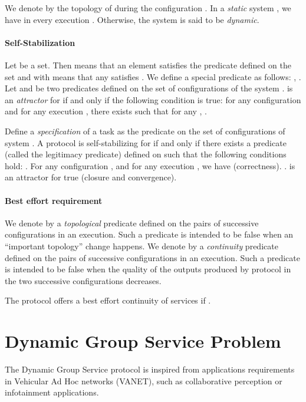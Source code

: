\documentclass[11pt,english]{article}
\begin{document}
We denote by  the topology of  during the configuration
.
In a \emph{static} system , we have  in every
execution .  Otherwise, the system  is said to
be \emph{dynamic}.

\paragraph{Self-Stabilization}
Let  be a set. Then  means that an element  satisfies the predicate  defined on the set  and
 with  means that any  satisfies
.
We define a special predicate  as follows:
, .
Let  and  be two predicates defined on the set of configurations
 of the system .   is an {\em attractor} for
 if and only if the following condition is true: for any configuration
 and for any execution , there exists  such that for any , .

Define a \emph{specification} of a task as the predicate  on the set
 of configurations of system .
A protocol  is self-stabilizing
for  if and only if
there exists a predicate  (called the legitimacy predicate)
defined on  such that the following conditions hold:\newline
{}. For any configuration , and for any execution , we have  (correctness).
\newline
{}.  is an attractor for \textsf{true} (closure and convergence).

\paragraph{Best effort requirement}
We denote by  a \emph{topological} predicate defined on the pairs of
successive configurations in an execution. Such a predicate is intended to be
false when an ``important topology'' change happens.
We denote by  a \emph{continuity} predicate defined on the pairs of
successive configurations in an execution. Such a predicate is intended to be
false when the quality of the outputs produced by protocol
 in the two successive configurations decreases.

The protocol  offers a best effort continuity of services if .




\section{Dynamic Group Service Problem}\label{s:spec}

The Dynamic Group Service protocol is inspired from applications requirements in
Vehicular Ad Hoc networks (VANET), such as collaborative perception or
infotainment applications.
\end{document}
